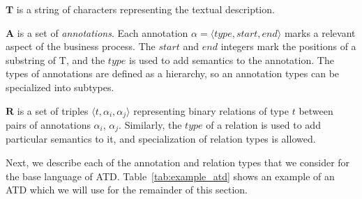 
\begin{description}
\item{$\mathbf{T}$}{ is a string of characters representing the textual description.}
\item{$\mathbf{A}$}{ is a set of \emph{annotations}. Each annotation $\alpha =
    \langle type, start, end \rangle$ marks a relevant aspect of the business
    process. The $start$ and $end$ integers mark the positions of a substring of
    T, and the $type$ is used to add semantics to the annotation. The types of
    annotations are defined as a hierarchy, so an annotation types can be specialized
    into subtypes.}
\item{$\mathbf{R}$}{ is a set of triples $\langle t, \alpha_i,
    \alpha_j \rangle$ representing binary relations of type $t$ between pairs of
    annotations $\alpha_i$, $\alpha_j$. Similarly, the $type$ of a relation is
    used to add particular semantics to it, and specialization of relation
    types is allowed.}
\end{description}

Next, we describe each of the annotation and relation types that we consider for
the base language of ATD. Table~\ref{tab:example_atd} shows an example of an
ATD which we will use for the remainder of this section.

